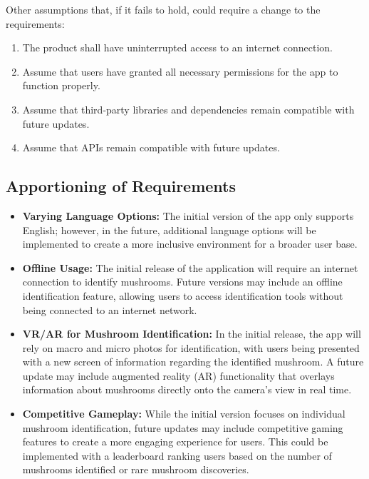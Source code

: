 \documentclass[]{article}
\begin{document}
Other assumptions that, if it fails to hold, could require a change to the requirements:
\begin{enumerate}
	\item The product shall have uninterrupted access to an internet connection.
    \item Assume that users have granted all necessary permissions for the app to function properly.
    \item Assume that third-party libraries and dependencies remain compatible with future updates.
    \item Assume that APIs remain compatible with future updates.
\end{enumerate}

\subsection{Apportioning of Requirements}
\label{sub:apportioning_of_requirements}
\begin{itemize}
	\item \textbf{Varying Language Options:} The initial version of the app only supports English; however, in the future, additional language options will be implemented to create a more inclusive environment for a broader user base.
	\item \textbf{Offline Usage:} The initial release of the application will require an internet connection to identify mushrooms. Future versions may include an offline identification feature, allowing users to access identification tools without being connected to an internet network.
	\item \textbf{VR/AR for Mushroom Identification:} In the initial release, the app will rely on macro and micro photos for identification, with users being presented with a new screen of information regarding the identified mushroom. A future update may include augmented reality (AR) functionality that overlays information about mushrooms directly onto the camera’s view in real time.
	\item \textbf{Competitive Gameplay:} While the initial version focuses on individual mushroom identification, future updates may include competitive gaming features to create a more engaging experience for users. This could be implemented with a leaderboard ranking users based on the number of mushrooms identified or rare mushroom discoveries.
\end{itemize}
\end{document}

